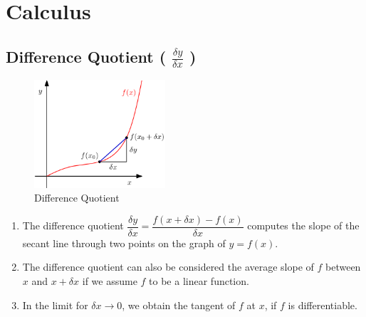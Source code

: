 \chapter{Calculus}

\section{Difference Quotient ( $\displaystyle\frac{\delta y}{\delta x}$ )}\label{Difference Quotient}

\begin{table}[H]
    \begin{minipage}{0.39\linewidth}
        \begin{figure}[H]
            \centering
            \includegraphics[height=4cm]{Pictures/maths/Difference Quotient.png}
            \caption{Difference Quotient}
        \end{figure}
    \end{minipage}
    \hfill
    \begin{minipage}{0.59\linewidth}
        \begin{enumerate}
            \item The difference quotient \( \displaystyle\dfrac{\delta y}{\delta x} = \displaystyle\dfrac{f(x + \delta x) - f(x)}{\delta x} \) computes the slope of the secant line through two points on the graph of $y = f(x)$. 
            
            \item The difference quotient can also be considered the average slope of $f$ between $x$ and $x + \delta x$ if we assume $f$ to be a linear function. 
            
            \item In the limit for $\delta x \rightarrow 0$, we obtain the tangent of $f$ at $x$, if $f$ is differentiable.

        \end{enumerate}
    \end{minipage}
\end{table}




